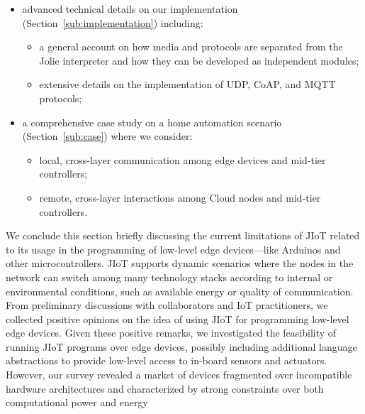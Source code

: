 \begin{itemize}
 \item advanced technical details on our implementation (Section~\ref{sub:implementation}) including:

       \begin{itemize}
        \item a general account on how media and protocols are separated from the
              Jolie interpreter and how they can be developed as independent modules;

        \item extensive details on the implementation of UDP, CoAP, and MQTT
              protocols;

       \end{itemize}

 \item a comprehensive case study on a home automation scenario (Section~\ref{sub:case}) where we
       consider:

       \begin{itemize}

        \item local, cross-layer communication among edge devices and
              mid-tier controllers;

        \item remote, cross-layer interactions among Cloud nodes and mid-tier
              controllers.

       \end{itemize}

\end{itemize}
%
We conclude this section briefly discussing the current limitations of JIoT
related to its usage in the programming of low-level edge devices---like
Arduinos and other microcontrollers. JIoT supports dynamic scenarios where the
nodes in the network can switch among many technology stacks according to
internal or environmental conditions, such as available energy or quality of
communication. From preliminary discussions with collaborators and IoT
practitioners, we collected positive opinions on the idea of using JIoT for
programming low-level edge devices. Given these positive remarks, we
investigated the feasibility of running JIoT programs over edge devices,
possibly including additional language abstractions to provide low-level
access to in-board sensors and actuators. However, our survey revealed a
market of devices fragmented over incompatible hardware architectures and
characterized by strong constraints over both computational power and energy
